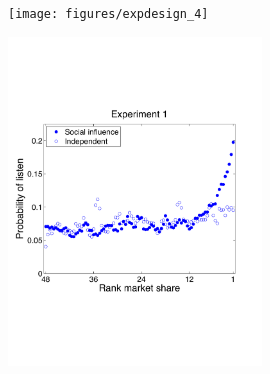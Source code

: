 \documentclass[aspectratio=169]{beamer}
\begin{document}
\begin{frame}

\begin{figure}
  \centering
  \texttt{[image: figures/expdesign\_4]}
\end{figure}

\end{frame}
\begin{frame}

\setcounter{subfigure}{0}
\begin{figure}
  \centering
  \hspace{0in}
\end{figure}

\end{frame}
\begin{frame}

\begin{figure}
  \centering
  \includegraphics[width= 0.6\textwidth]{figures/listenchoice_v1_smoothed_1}
\end{figure}

\end{frame}
\end{document}
